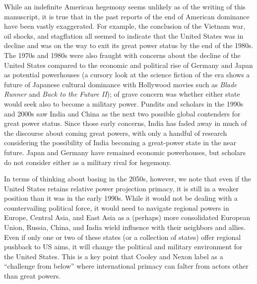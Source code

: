 While an indefinite American hegemony seems unlikely as of the writing of this manuscript, it is true that in the past reports of the end of American dominance have been vastly exaggerated. For example, the conclusion of the Vietnam war, oil shocks, and stagflation all seemed to indicate that the United States was in decline and was on the way to exit its great power status by the end of the 1980s.\cite{keohane1984,bergesen1985} The 1970s and 1980s were also fraught with concerns about the decline of the United States compared to the economic and political rise of Germany and Japan as potential powerhouses (a cursory look at the science fiction of the era shows a future of Japanese cultural dominance with Hollywood movies such as \textit{Blade Runner} and \textit{Back to the Future II}); of grave concern was whether either state would seek also to become a military power.\cite{maull1989} Pundits and scholars in the 1990s and 2000s saw India and China as the next two possible global contenders for great power status.\cite{gupta2006} Since those early concerns, India has faded away in much of the discourse about coming great powers, with only a handful of research considering the possibility of India becoming a great-power state in the near future.\cite{pant2007,carranza2017,narlikar2019} Japan  and Germany have remained economic powerhouses, but scholars do not consider either as a military rival for hegemony. 


In terms of thinking about basing in the 2050s, however, we note that even if the United States retains relative power projection primacy, it is still in a weaker position than it was in the early 1990s. While it would not be dealing with a countervailing political force, it would need to navigate regional powers in Europe, Central Asia, and East Asia as a (perhaps) more consolidated European Union, Russia, China, and India wield influence with their neighbors and allies. Even if only one or two of these states (or a collection of states) offer regional pushback to US aims, it will change the political and military environment for the United States. This is a key point that Cooley and Nexon label as a ``challenge from below'' where international primacy can falter from actors other than great powers.\cite{Cooley2020}

